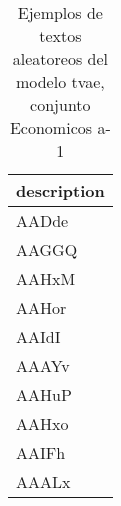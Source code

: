 \begin{table}[H]
\centering
\fontsize{8}{14}\selectfont
\caption{Ejemplos de textos aleatoreos del modelo tvae, conjunto Economicos a-1}
\label{table-sample10-economicos-a-1-tvae-text}
\begin{tabular}{|m{50em}|}
\hline
\rowcolor[gray]{0.8}
description \\
\hline AADde \\
\hline AAGGQ \\
\hline AAHxM \\
\hline AAHor \\
\hline AAIdI \\
\hline AAAYv \\
\hline AAHuP \\
\hline AAHxo \\
\hline AAIFh \\
\hline AAALx \\
\hline
\end{tabular}
\end{table}
